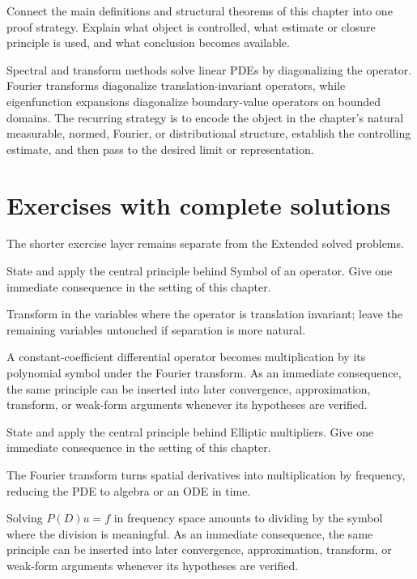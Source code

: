 \begin{problem}\label{prob:iii28-problem-12}
Connect the main definitions and structural theorems of this chapter into one proof strategy. Explain what object is controlled, what estimate or closure principle is used, and what conclusion becomes available.
\end{problem}
\begin{solution}
Spectral and transform methods solve linear PDEs by diagonalizing the operator. Fourier transforms diagonalize translation-invariant operators, while eigenfunction expansions diagonalize boundary-value operators on bounded domains. The recurring strategy is to encode the object in the chapter's natural measurable, normed, Fourier, or distributional structure, establish the controlling estimate, and then pass to the desired limit or representation.
\end{solution}
\section{Exercises with complete solutions}
The shorter exercise layer remains separate from the Extended solved problems.

\begin{exercise}\label{exr:iii28-01}
State and apply the central principle behind Symbol of an operator. Give one immediate consequence in the setting of this chapter.
\end{exercise}
\begin{hint}
Transform in the variables where the operator is translation invariant; leave the remaining variables untouched if separation is more natural.
\end{hint}
\begin{solution}
A constant-coefficient differential operator becomes multiplication by its polynomial symbol under the Fourier transform. As an immediate consequence, the same principle can be inserted into later convergence, approximation, transform, or weak-form arguments whenever its hypotheses are verified.
\end{solution}

\begin{exercise}\label{exr:iii28-02}
State and apply the central principle behind Elliptic multipliers. Give one immediate consequence in the setting of this chapter.
\end{exercise}
\begin{hint}
The Fourier transform turns spatial derivatives into multiplication by frequency, reducing the PDE to algebra or an ODE in time.
\end{hint}
\begin{solution}
Solving $P(D)u=f$ in frequency space amounts to dividing by the symbol where the division is meaningful. As an immediate consequence, the same principle can be inserted into later convergence, approximation, transform, or weak-form arguments whenever its hypotheses are verified.
\end{solution}

